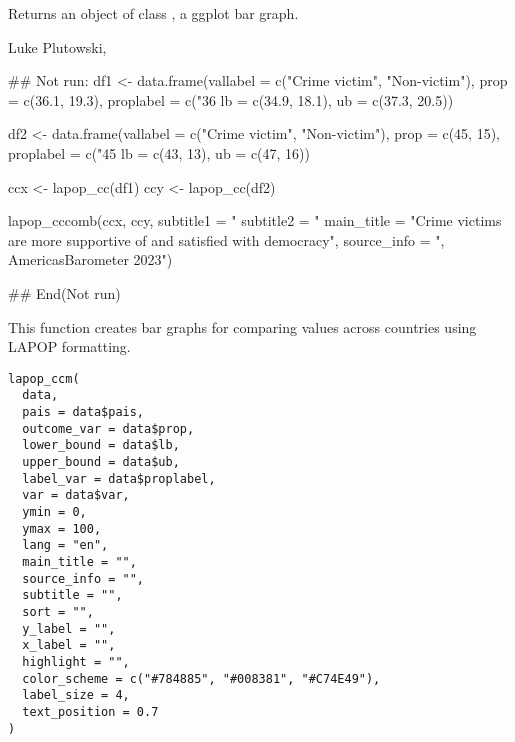 \documentclass[a4paper]{book}
\begin{document}
%
\begin{Value}
Returns an object of class , a ggplot bar graph.
\end{Value}
%
\begin{Author}
Luke Plutowski, 
\end{Author}
%
\begin{Examples}
\begin{ExampleCode}
## Not run: 
df1 <- data.frame(vallabel = c("Crime victim", "Non-victim"),
prop = c(36.1, 19.3),
proplabel = c("36%
lb = c(34.9, 18.1),
ub = c(37.3, 20.5))

df2 <- data.frame(vallabel = c("Crime victim", "Non-victim"),
prop = c(45, 15),
proplabel = c("45%
lb = c(43, 13),
ub = c(47, 16))

ccx <- lapop_cc(df1)
ccy <- lapop_cc(df2)

lapop_cccomb(ccx, ccy,
subtitle1 = "%
subtitle2 = "%
main_title = "Crime victims are more supportive of and satisfied with democracy",
source_info = ", AmericasBarometer 2023")

## End(Not run)
\end{ExampleCode}
\end{Examples}
%
\begin{Description}
This function creates bar graphs for comparing values across countries using LAPOP formatting.
\end{Description}
%
\begin{Usage}
\begin{verbatim}
lapop_ccm(
  data,
  pais = data$pais,
  outcome_var = data$prop,
  lower_bound = data$lb,
  upper_bound = data$ub,
  label_var = data$proplabel,
  var = data$var,
  ymin = 0,
  ymax = 100,
  lang = "en",
  main_title = "",
  source_info = "",
  subtitle = "",
  sort = "",
  y_label = "",
  x_label = "",
  highlight = "",
  color_scheme = c("#784885", "#008381", "#C74E49"),
  label_size = 4,
  text_position = 0.7
)
\end{verbatim}
\end{Usage}
%
\end{document}
